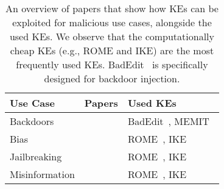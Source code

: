 \begin{table}[!htp]\centering
\caption{An overview of papers that show how KEs can be exploited for malicious use cases, alongside the used KEs. We observe that the computationally cheap KEs (e.g., ROME and IKE) are the most frequently used KEs. BadEdit~\cite{li2024badedit} is specifically designed for backdoor injection.}
\scriptsize
\begin{tabular}{lp{2cm}p{3cm}}\toprule
\textbf{Use Case} &\textbf{Papers} & \textbf{Used KEs} \\\midrule
Backdoors &\citet{li2024badedit, qiu2024megen} & BadEdit~\cite{li2024badedit}, MEMIT~\cite{meng-etal-2022-memit} \\ \midrule
Bias &\citet{chen-etal-2024-can} &ROME~\cite{meng-etal-2022-locating}, IKE~\cite{zheng-etal-2023-edit} \\ \midrule
Jailbreaking & \citet{chen-etal-2024-can, hazra-etal-2024-sowing} & ROME~\cite{meng-etal-2022-locating}, IKE~\cite{zheng-etal-2023-edit} \\ \midrule
Misinformation &\citet{chen-etal-2024-can, ju-etal-2024-flooding} &   ROME~\cite{meng-etal-2022-locating}, IKE~\cite{zheng-etal-2023-edit} \\ 
\bottomrule
\end{tabular}

\label{tab:malicious}

\end{table}
